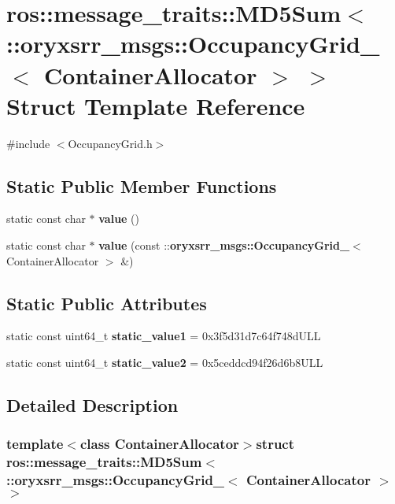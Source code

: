 \section{ros\-:\-:message\-\_\-traits\-:\-:\-M\-D5\-Sum$<$ \-:\-:oryxsrr\-\_\-msgs\-:\-:\-Occupancy\-Grid\-\_\-$<$ \-Container\-Allocator $>$ $>$ \-Struct \-Template \-Reference}
\label{structros_1_1message__traits_1_1MD5Sum_3_01_1_1oryxsrr__msgs_1_1OccupancyGrid___3_01ContainerAllocator_01_4_01_4}


{\ttfamily \#include $<$\-Occupancy\-Grid.\-h$>$}

\subsection*{\-Static \-Public \-Member \-Functions}
\begin{DoxyCompactItemize}
\item 
static const char $\ast$ {\bf value} ()
\item 
static const char $\ast$ {\bf value} (const \-::{\bf oryxsrr\-\_\-msgs\-::\-Occupancy\-Grid\-\_\-}$<$ \-Container\-Allocator $>$ \&)
\end{DoxyCompactItemize}
\subsection*{\-Static \-Public \-Attributes}
\begin{DoxyCompactItemize}
\item 
static const uint64\-\_\-t {\bf static\-\_\-value1} = 0x3f5d31d7c64f748d\-U\-L\-L
\item 
static const uint64\-\_\-t {\bf static\-\_\-value2} = 0x5ceddcd94f26d6b8\-U\-L\-L
\end{DoxyCompactItemize}


\subsection{\-Detailed \-Description}
\subsubsection*{template$<$class Container\-Allocator$>$struct ros\-::message\-\_\-traits\-::\-M\-D5\-Sum$<$ \-::oryxsrr\-\_\-msgs\-::\-Occupancy\-Grid\-\_\-$<$ Container\-Allocator $>$ $>$}



